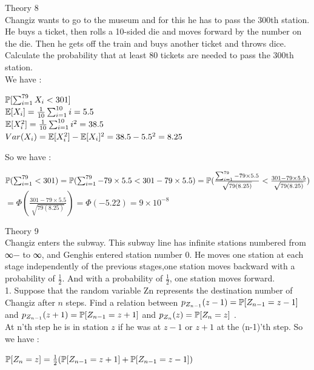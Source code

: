 \documentclass[30pt]{article}
\begin{document}
\newpage
{\Large \color{blue} Theory 8 } \\
{\color{blue} Changiz wants to go to the museum and for this he has to pass the 300th station. He buys a ticket, then rolls a 10-sided die and moves forward by the number on the die. Then he gets off the train and buys another ticket and throws dice. Calculate the probability that at least 80 tickets are needed to pass the 300th station. } \\ \newline 
We have : 
\begin{center}
    $\Bbb{P}[\sum_{i=1}^{79}X_i < 301 ] $ \vspace{0.3cm}\\
    $\Bbb{E}[X_i] = \frac{1}{10}\sum_{i=1}^{10}i = 5.5 $ \vspace{0.3cm} \\
    $\Bbb{E}[X_i^2] = \frac{1}{10}\sum_{i=1}^{10}i^2 = 38.5 $ \vspace{0.3cm} \\
    $Var(X_i) = \Bbb{E}[X_i^2] - \Bbb{E}[X_i]^2 = 38.5 - 5.5^2 = 8.25 $ \vspace{0.3cm} \\ 
\end{center} 
So we have : \\
\begin{center}
    $\Bbb{P}(\sum_{i=1}^{79} < 301) =\Bbb{P}(\sum_{i=1}^{79} - 79\times 5.5 < 301 - 79\times 5.5 ) = 
    \Bbb{P}(\frac{\sum_{i=1}^{79} - 79\times 5.5}{\sqrt{79(8.25)}} < \frac{301 - 79\times 5.5}{\sqrt{79(8.25)}})  $ \vspace{0.3cm} \\
    $= \Phi ( \frac{301 - 79\times 5.5}{\sqrt{79(8.25)}}) = \Phi (-5.22) = 9 \times 10^{-8} $
\end{center}


{\Large \color{blue} Theory 9 } \\
{\color{blue} Changiz enters the subway. This subway line has infinite stations numbered from ∞− to ∞, and Genghis entered station number 0. He moves one station at each stage independently of the previous stages,one station moves backward with a probability of $\frac{1}{2}$. And with a probability of $\frac{1}{2}$, one station moves forward. } \\ \newline 
{\color{blue} {\large 1.} Suppose that the random variable Zn represents the destination number of Changiz after $n$ steps. Find a relation between $p_{Z_{n-1}}(z-1) = \Bbb{P}[Z_{n-1} = z - 1] $ and $p_{Z_{n-1}}(z+1) = \Bbb{P}[Z_{n-1} = z + 1] $ and $p_{Z_{n}}(z) = \Bbb{P}[Z_{n} = z] $ . } \\ \newline 
At n'th step he is in station $z$ if he was at $z-1$ or $z+1$ at the (n-1)'th step. So we have : \\
\begin{center}
    $\Bbb{P}[Z_{n} = z]  = \frac{1}{2}(\Bbb{P}[Z_{n-1} = z + 1] + \Bbb{P}[Z_{n-1} = z - 1]) $
\end{center} \\ 
\end{document}
